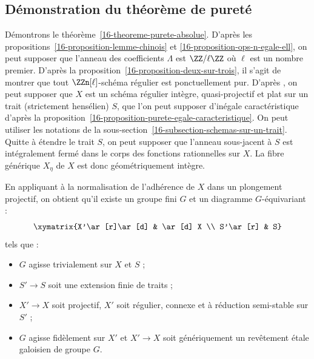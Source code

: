 \documentclass[10pt]{../fichiers-configuration-latex/smfart}
\begin{document}
\subsection{Démonstration du théorème de pureté}%
\label{16-subsection-demonstration-theoreme-purete}

Démontrons le théorème~\ref{16-theoreme-purete-absolue}.
D'après les propositions~\ref{16-proposition-lemme-chinois} et
\ref{16-proposition-ops-n-egale-ell}, on peut supposer que l'anneau des
coefficients $\Lambda$ est $\ZZ/\ell\ZZ$ où $\ell$ est un nombre premier.
D'après la proposition~\ref{16-proposition-deux-sur-trois}, il s'agit de montrer
que tout $\ZZn[\ell]$-schéma régulier est ponctuellement pur. D'après
\cite[corollary~6.1.5]{AZUMINO@Fujiwara}, on peut supposer que $X$ est un schéma
régulier intègre, quasi-projectif et plat 
sur un trait (strictement hensélien) $S$, que
l'on peut supposer d'inégale caractéristique d'après
la proposition~\ref{16-proposition-purete-egale-caracteristique}. On peut
utiliser les notations de la
sous-section~\ref{16-subsection-schemas-sur-un-trait}.
Quitte à étendre le
trait $S$, on peut supposer que l'anneau sous-jacent à $S$ est
intégralement fermé dans le corps des fonctions rationnelles sur $X$. La
fibre générique $X_\eta$ de $X$ est donc géométriquement intègre.

En appliquant \cite[proposition~4.4.1]{BS@Vidal} à la normalisation de
l'adhérence de $X$ dans un plongement projectif, on obtient qu'il existe un
groupe fini $G$ et un diagramme $G$-équivariant :
\[
\xymatrix{X'\ar[r]\ar[d] & \ar[d] X \\ S'\ar[r] & S}
\]
tels que :
\begin{itemize}
\item $G$ agisse trivialement sur $X$ et $S$ ;
\item $S'\to S$ soit une extension finie de traits ;
\item $X'\to X$ soit projectif, $X'$ soit régulier, connexe
et à réduction semi-stable sur $S'$ ;
\item $G$ agisse fidèlement sur $X'$ et $X'\to X$ soit génériquement un
revêtement étale galoisien de groupe $G$.
\end{itemize}
\end{document}
